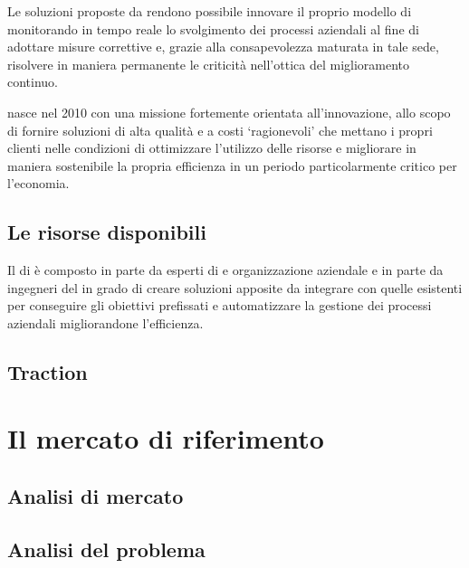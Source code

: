 Le soluzioni proposte da \team rendono possibile innovare il proprio modello di \bsn monitorando in tempo reale lo svolgimento dei processi aziendali al fine di adottare misure correttive  e, grazie alla consapevolezza maturata in tale sede, risolvere in maniera permanente le criticità nell'ottica del miglioramento continuo.

\team nasce nel 2010 con una missione fortemente orientata all'innovazione, allo scopo di fornire soluzioni \sw di alta qualità e a costi `ragionevoli' che mettano i propri clienti nelle condizioni di ottimizzare l'utilizzo delle risorse e migliorare in maniera sostenibile la propria efficienza in un periodo particolarmente critico per l'economia.

\subsection{Le risorse disponibili}
Il  di \team è composto in parte da esperti di \bsn {} e organizzazione aziendale e in parte da ingegneri del \sw in grado di creare soluzioni apposite da integrare con quelle esistenti per conseguire gli obiettivi prefissati e automatizzare la gestione dei processi aziendali migliorandone l'efficienza.


\subsection{Traction}

\section{Il mercato di riferimento}\label{sec:whattheproblemis}
\subsection{Analisi di mercato}

\subsection{Analisi del problema}

